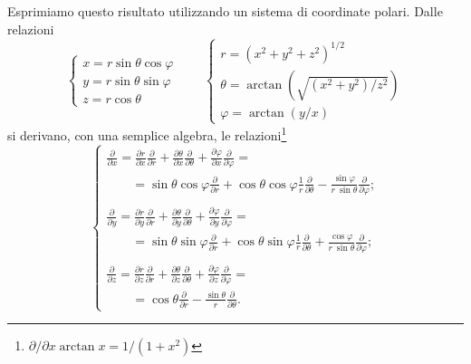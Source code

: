 Esprimiamo questo risultato utilizzando un sistema di coordinate polari. Dalle relazioni
\begin{equation}
\begin{cases}
x=r\sin \theta \cos \varphi \\
y=r\sin \theta \sin \varphi \\
z= r\cos\theta
\end{cases}
\qquad
\begin{cases}
r=(x^2+y^2+z^2)^{1/2} \\
\theta=\arctan\left(\sqrt{(x^2+y^2)/z^2}\right) \\
\varphi= \arctan \left(y/x\right)
\end{cases}
\end{equation}
si derivano, con una semplice algebra, le relazioni\footnote{$\partial/\partial x \arctan x = 1/(1+x^2)$}
\begin{equation}
\begin{cases}
\displaystyle{\frac{\partial}{\partial x} = \frac{\partial r}{\partial x}\frac{\partial}{\partial r}+\frac{\partial \theta}{\partial x}\frac{\partial}{\partial \theta}+ \frac{\partial \varphi}{\partial x}\frac{\partial}{\partial \varphi} = }\\
\qquad = \displaystyle{\sin\theta \cos \varphi \frac{\partial}{\partial r}+\cos\theta \cos \varphi\frac{1}{r} \frac{\partial}{\partial \theta}-\frac{\sin \varphi}{r\ \sin \theta} \frac{\partial}{\partial \varphi}}; \\
\\
\displaystyle{\frac{\partial}{\partial y} = \frac{\partial r}{\partial y}\frac{\partial}{\partial r}+\frac{\partial \theta}{\partial y}\frac{\partial}{\partial \theta}+ \frac{\partial \varphi}{\partial y}\frac{\partial}{\partial \varphi} = }\\
\qquad = \displaystyle{\sin\theta \sin \varphi \frac{\partial}{\partial r}+\cos\theta \sin \varphi\frac{1}{r} \frac{\partial}{\partial \theta}+\frac{\cos \varphi}{r\ \sin \theta} \frac{\partial}{\partial \varphi}}; \\
\\
\displaystyle{\frac{\partial}{\partial z} = \frac{\partial r}{\partial z}\frac{\partial}{\partial r}+\frac{\partial \theta}{\partial z}\frac{\partial}{\partial \theta}+ \frac{\partial \varphi}{\partial z}\frac{\partial}{\partial \varphi} = }\\
\qquad = \displaystyle{\cos\theta\frac{\partial}{\partial r}-\frac{\sin \theta}{r} \frac{\partial}{\partial \theta}}.
\end{cases}
\end{equation}
